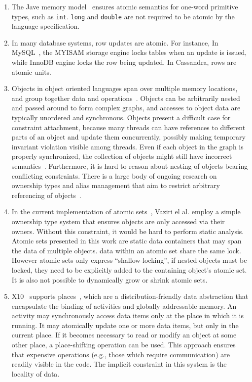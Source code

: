 \documentclass[]{usiinfprospectus}
\begin{document}
\begin{enumerate}
	\item The Jave memory model~\cite{javamemorymodel} ensures atomic semantics for one-word primitive types, such as \texttt{int}. \texttt{long} and \texttt{double} are not required to be atomic by the language specification.  
	\item In many database systems, row updates are atomic. For instance, In MySQL~\cite{mysql}, the MYISAM storage engine locks tables when an update is issued, while InnoDB engine locks the row being updated. In Cassandra, rows are atomic units. 
	\item Objects in object oriented languages span over multiple memory locations, and group together data and operations~\cite{rentsch1982object}. Objects can be arbitrarily nested and passed around to form complex graphs, and accesses to object data are typically unordered and synchronous. Objects present a difficult case for constraint attachment, because many threads can have references to different parts of an object and update them concurrently, possibly making temporary invariant violation visible among threads. Even if each object in the graph is properly synchronized, the collection of objects might still have incorrect semantics~\cite{artho2003high}.  Furthermore, it is hard to reason about nesting of objects bearing conflicting constraints. There is a large body of ongoing research on ownership types and alias management that aim to restrict arbitrary referencing of objects~\cite{muller1999universes, clarke2008minimal, haller2010capabilities}.
	\item In the current implementation of atomic sets~\cite{dolby2012data}, Vaziri el al. employ a simple ownership type system that ensures objects are only accessed via their owners. Without this constraint, it would be hard to perform static analysis. Atomic sets presented in this work are static data containers that may span the data of multiple objects. data within an atomic set share the same lock. However atomic sets only express ``shallow-locking'', if nested objects must be locked, they need to be explicitly added to the containing object's atomic set. It is also not possible to dynamically grow or shrink atomic sets. 
	\item X10~\cite{charles2005x10} supports places~\cite{x10spec}, which are  a distribution-friendly data abstraction that encapsulate the binding of activities and globally addressable memory. An activity may synchronously access data items only at the place in which it is running. It may atomically update one or more data items, but only in the current place. If it becomes necessary to read or modify an object at some other place, a place-shifting operation can be used. This approach ensures that expensive operations (e.g., those which require communication) are readily visible in the code. The implicit constraint in this system is the locality of data. 

\end{enumerate}
\end{document}
